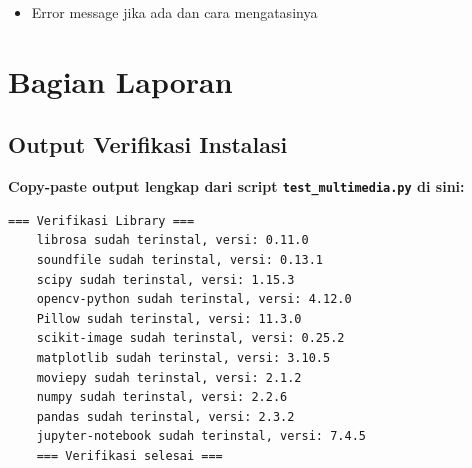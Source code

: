 \documentclass[11pt,a4paper]{article}
\begin{document}
\begin{itemize}
    \item Error message jika ada dan cara mengatasinya

\end{itemize}


\section{Bagian Laporan}

\subsection{Output Verifikasi Instalasi}
\textbf{Copy-paste output lengkap dari script \texttt{test\_multimedia.py} di sini:}

\begin{lstlisting}[caption=Output verifikasi instalasi]
    === Verifikasi Library ===
    librosa sudah terinstal, versi: 0.11.0
    soundfile sudah terinstal, versi: 0.13.1
    scipy sudah terinstal, versi: 1.15.3
    opencv-python sudah terinstal, versi: 4.12.0
    Pillow sudah terinstal, versi: 11.3.0
    scikit-image sudah terinstal, versi: 0.25.2
    matplotlib sudah terinstal, versi: 3.10.5
    moviepy sudah terinstal, versi: 2.1.2
    numpy sudah terinstal, versi: 2.2.6
    pandas sudah terinstal, versi: 2.3.2
    jupyter-notebook sudah terinstal, versi: 7.4.5
    === Verifikasi selesai ===
\end{lstlisting}
\end{document}
